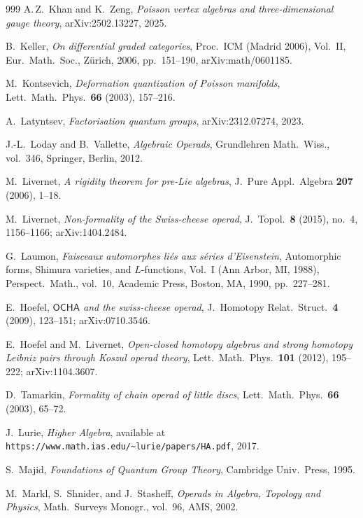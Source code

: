 \documentclass[11pt]{memoir}
\begin{document}
\begin{thebibliography}{999}
 A.\,Z.~Khan and K.~Zeng, \emph{Poisson vertex algebras and three-dimensional gauge theory}, arXiv:2502.13227, 2025.

 B.~Keller, \emph{On differential graded categories}, Proc.\ ICM (Madrid 2006), Vol.~II, Eur.\ Math.\ Soc., Z\"urich, 2006, pp.~151--190, arXiv:math/0601185.

 M.~Kontsevich, \emph{Deformation quantization of Poisson manifolds}, Lett.\ Math.\ Phys.\ \textbf{66} (2003), 157--216.

 A.~Latyntsev, \emph{Factorisation quantum groups}, arXiv:2312.07274, 2023.

 J.-L.~Loday and B.~Vallette, \emph{Algebraic Operads}, Grundlehren Math.\ Wiss., vol.~346, Springer, Berlin, 2012.

 M.~Livernet, \emph{A rigidity theorem for pre-Lie algebras}, J.\ Pure Appl.\ Algebra \textbf{207} (2006), 1--18.

 M.~Livernet, \emph{Non-formality of the Swiss-cheese operad}, J.\ Topol.\ \textbf{8} (2015), no.~4, 1156--1166; arXiv:1404.2484.

 G.~Laumon, \emph{Faisceaux automorphes li\'es aux s\'eries d'Eisenstein}, Automorphic forms, Shimura varieties, and $L$-functions, Vol.~I (Ann Arbor, MI, 1988), Perspect.\ Math., vol.~10, Academic Press, Boston, MA, 1990, pp.~227--281.

 E.~Hoefel, \emph{$\mathsf{OCHA}$ and the swiss-cheese operad}, J.\ Homotopy Relat.\ Struct.\ \textbf{4} (2009), 123--151; arXiv:0710.3546.

 E.~Hoefel and M.~Livernet, \emph{Open-closed homotopy algebras and strong homotopy Leibniz pairs through Koszul operad theory}, Lett.\ Math.\ Phys.\ \textbf{101} (2012), 195--222; arXiv:1104.3607.

 D.~Tamarkin, \emph{Formality of chain operad of little discs}, Lett.\ Math.\ Phys.\ \textbf{66} (2003), 65--72.

 J.~Lurie, \emph{Higher Algebra}, available at \texttt{https://www.math.ias.edu/\~{}lurie/papers/HA.pdf}, 2017.

 S.~Majid, \emph{Foundations of Quantum Group Theory}, Cambridge Univ.\ Press, 1995.

 M.~Markl, S.~Shnider, and J.~Stasheff, \emph{Operads in Algebra, Topology and Physics}, Math.\ Surveys Monogr., vol.~96, AMS, 2002.


\end{thebibliography}
\end{document}
